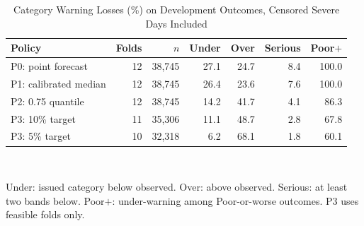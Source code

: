 \begin{table}[!t]
\caption{Category Warning Losses (\%) on Development Outcomes, Censored Severe Days Included}
\label{tab:warnings}
\centering
\footnotesize
\setlength{\aboverulesep}{0pt}\setlength{\belowrulesep}{0pt}\renewcommand{\arraystretch}{1.14}\setlength{\tabcolsep}{3.6pt}
\begin{tabularx}{\columnwidth}{X r r r r r r}
\toprule
\rowcolor{TableHeader}\textbf{Policy} & \textbf{Folds} & \textbf{$n$} & \textbf{Under} & \textbf{Over} & \textbf{Serious} & \textbf{Poor$+$}\\
\midrule
P0: point forecast & 12 & 38{,}745 & 27.1 & 24.7 & 8.4 & 100.0\\
P1: calibrated median & 12 & 38{,}745 & 26.4 & 23.6 & 7.6 & 100.0\\
P2: 0.75 quantile & 12 & 38{,}745 & 14.2 & 41.7 & 4.1 & 86.3\\
\midrule
P3: 10\% target & 11 & 35{,}306 & 11.1 & 48.7 & 2.8 & 67.8\\
P3: 5\% target & 10 & 32{,}318 & 6.2 & 68.1 & 1.8 & 60.1\\
\bottomrule
\end{tabularx}
\\[3pt]
\parbox{\columnwidth}{\footnotesize Under: issued category below observed. Over: above observed. Serious: at least two bands below. Poor$+$: under-warning among Poor-or-worse outcomes. P3 uses feasible folds only.}
\end{table}
